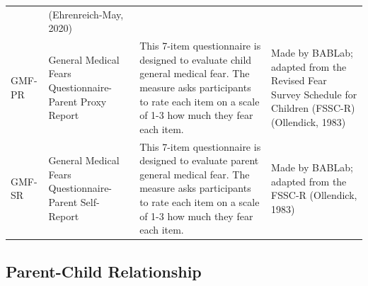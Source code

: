 \documentclass[]{book}
\begin{document}
\begin{longtable}[]{@{}llll@{}}
\begin{minipage}[t]{0.22\columnwidth}
\end{minipage} & \begin{minipage}[t]{0.18\columnwidth}\raggedright
(Ehrenreich-May, 2020)\strut
\end{minipage}\tabularnewline
\begin{minipage}[t]{0.22\columnwidth}\raggedright
GMF-PR\strut
\end{minipage} & \begin{minipage}[t]{0.27\columnwidth}\raggedright
General Medical Fears Questionnaire- Parent Proxy Report\strut
\end{minipage} & \begin{minipage}[t]{0.22\columnwidth}\raggedright
This 7-item questionnaire is designed to evaluate child general medical fear. The measure asks participants to rate each item on a scale of 1-3 how much they fear each item.\strut
\end{minipage} & \begin{minipage}[t]{0.18\columnwidth}\raggedright
Made by BABLab; adapted from the Revised Fear Survey Schedule for Children (FSSC-R) (Ollendick, 1983)\strut
\end{minipage}\tabularnewline
\begin{minipage}[t]{0.22\columnwidth}\raggedright
GMF-SR\strut
\end{minipage} & \begin{minipage}[t]{0.27\columnwidth}\raggedright
General Medical Fears Questionnaire- Parent Self-Report\strut
\end{minipage} & \begin{minipage}[t]{0.22\columnwidth}\raggedright
This 7-item questionnaire is designed to evaluate parent general medical fear. The measure asks participants to rate each item on a scale of 1-3 how much they fear each item.\strut
\end{minipage} & \begin{minipage}[t]{0.18\columnwidth}\raggedright
Made by BABLab; adapted from the FSSC-R (Ollendick, 1983)\strut
\end{minipage}\tabularnewline
\bottomrule
\end{longtable}

\hypertarget{parent-child-relationship}{%
\subsection{Parent-Child Relationship}\label{parent-child-relationship}}
\end{document}
